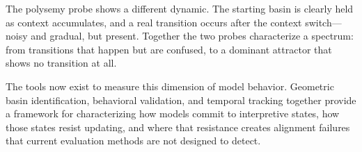 \documentclass[11pt,a4paper]{article}
\begin{document}
The polysemy probe shows a different dynamic. The starting basin is clearly held as context accumulates, and a real transition occurs after the context switch---noisy and gradual, but present. Together the two probes characterize a spectrum: from transitions that happen but are confused, to a dominant attractor that shows no transition at all.

The tools now exist to measure this dimension of model behavior. Geometric basin identification, behavioral validation, and temporal tracking together provide a framework for characterizing how models commit to interpretive states, how those states resist updating, and where that resistance creates alignment failures that current evaluation methods are not designed to detect.


\end{document}
